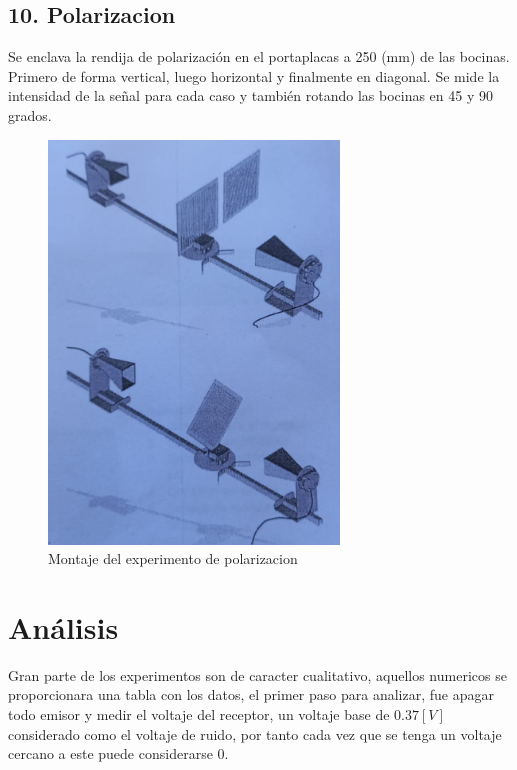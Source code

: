 \documentclass[a4paper,twocolumn,10pt]{article}
\begin{document}
\subsection*{10. Polarizacion}
Se enclava la rendija de polarización en el portaplacas a 250 (mm) de las bocinas. Primero de forma vertical, luego horizontal y finalmente en diagonal. Se mide la intensidad de la señal para cada caso y también rotando las bocinas en 45 y 90 grados.
\begin{figure}[H]
    \centering
    \includegraphics[scale=.7]{MO_montaje/10.png}
    \caption{Montaje del experimento de polarizacion}
    \label{fig:montpol}
\end{figure}





\section{Análisis}
Gran parte de los experimentos son de caracter cualitativo, aquellos numericos se proporcionara una tabla con los datos, el primer paso para analizar, fue apagar todo emisor y medir el voltaje del receptor, un voltaje base de $0.37 [V]$ considerado como el voltaje de ruido, por tanto cada vez que se tenga un voltaje cercano a este puede considerarse 0.
\end{document}
